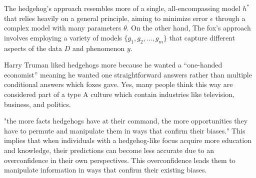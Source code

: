 \documentclass[12pt]{article}
\begin{document}


\begin{enumerate}


The hedgehog's approach resembles more of a single, all-encompassing model \(h^*\) that relies heavily on a general principle, aiming to minimize error \(\epsilon\) through a complex model with many parameters \(\theta\). On the other hand, The fox's approach involves employing a variety of models \(\{g_1, g_2, ..., g_m\}\) that capture different aspects of the data \(D\) and phenomenon \(y\).


Harry Truman liked hedgehogs more because he wanted a “one-handed economist” meaning he wanted one straightforward answers rather than multiple conditional answers which foxes gave. Yes, many people think this way are considered part of a type A culture which contain industries like television, business, and politics.


"the more facts hedgehogs have at their command, the more opportunities they have to permute and manipulate them in ways that confirm their biases." This implies that when individuals with a hedgehog-like focus acquire more education and knowledge, their predictions can become less accurate due to an overconfidence in their own perspectives. This overconfidence leads them to manipulate information in ways that confirm their existing biases.



\end{enumerate}
\end{document}
